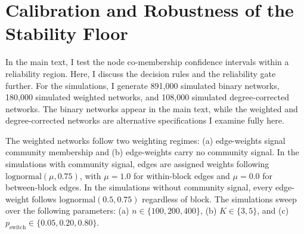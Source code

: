 \documentclass[11pt, letterpaper]{article}
\numberwithin{equation}{section}
\begin{document}
\section{Calibration and Robustness of the Stability Floor}
\label{app:coverage_robust}
In the main text, I test the node co-membership confidence intervals within a reliability region. Here, I discuss the decision rules and the reliability gate further. For the simulations, I generate 891,000 simulated binary networks, 180,000 simulated weighted networks, and 108,000 simulated degree-corrected networks. The binary networks appear in the main text, while the weighted and degree-corrected networks are alternative specifications I examine fully here.

The weighted networks follow two weighting regimes: (a) edge-weights signal community membership and (b) edge-weights carry no community signal. In the simulations with community signal, edges are assigned weights following $\mathrm{lognormal}(\mu, 0.75)$, with $\mu = 1.0$ for within-block edges and $\mu = 0.0$ for between-block edges. In the simulations without community signal, every edge-weight follows $\mathrm{lognormal}(0.5, 0.75)$ regardless of block. The simulations sweep over the following parameters: (a) $n \in \{100, 200, 400\}$, (b) $K \in \{3, 5\}$, and (c) $p_{\mathrm{switch}} \in \{0.05, 0.20, 0.80\}$.
\end{document}
